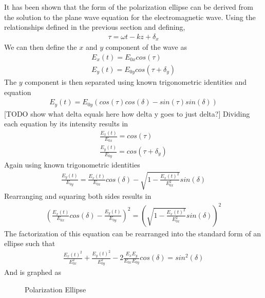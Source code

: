 It has been shown that the form of the polarization ellipse can be derived from the solution to the plane wave equation for the electromagnetic wave.  Using the relationships defined in the previous section and defining,
%
\begin{align}
    \tau=\omega t-kz+\delta_x
\end{align}
%
We can then define the $x$ and $y$ component of the wave as
%
\begin{align}
	E_x (t)=E_{0x} cos(\tau)\\
	E_y (t)=E_{0y} cos(\tau+\delta_y )
\end{align}
%
The $y$ component is then separated using known trigonometric identities and equation
%
\begin{align}
E_y (t)=E_{0y} (cos(\tau) cos(\delta)-sin(\tau)sin(\delta))
\end{align}
%
[TODO show what delta equals here how delta y goes to just delta?]
Dividing each equation by its intensity results in
%
\begin{align}
    \frac{E_x (t)}{E_{0x}} =cos(\tau) \\
    \frac{E_y (t)}{E_{0y}} =cos(\tau+\delta_y )
\end{align}
%
Again using known trigonometric identities
%
\begin{align}
    \frac{E_y (t)}{E_{0y}} = \frac{E_x (t)}{E_{0x}}   cos(\delta)-\sqrt{1-\frac{E_x (t)^2}{E_{0x}^2} } sin(\delta)
\end{align}
%
Rearranging and squaring both sides results in
%
\begin{align}
    (\frac{E_x (t)}{E_{0x}}   cos(\delta)-\frac{E_y (t)}{E_{0y}} )^2=(\sqrt{1-\frac{E_x (t)^2}{E_{0x}^2} } sin(\delta))^2
\end{align}
%
The factorization of this equation can be rearranged into the standard form of an ellipse such that
%
\begin{align}
    \frac{E_x (t)^2}{E_{0x}^2} +\frac{E_y (t)^2}{E_{0y}^2} -2 \frac{E_x E_y}{E_{0x} E_{0y} } cos(\delta)=sin^2 (\delta)
\end{align}
%
And is graphed as
\begin{figure}[!htb]
    \begin{center}
    \end{center}
    \caption{Polarization Ellipse}
    \label{fig:polarization}
\end{figure}
%

